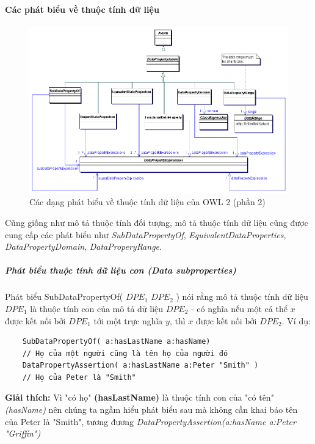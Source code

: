 	\paragraph{Các phát biểu về thuộc tính dữ liệu}
	\begin{figure}[h]
		\centering
		\includegraphics[width=150mm]{Figures/datapropertyAxiom.png}
		\caption{Các dạng phát biểu về thuộc tính dữ liệu của OWL 2 (phần 2) \label{overflow}}
	\end{figure}
	Cũng giống như mô tả thuộc tính đối tượng, mô tả thuộc tính dữ liệu cũng được cung cấp các phát biểu như \textit{SubDataPropertyOf}, \textit{EquivalentDataProperties}, \textit{DataPropertyDomain}, \textit{DataProperyRange}.
	
	\subparagraph{Phát biểu thuộc tính dữ liệu con (Data subproperties)} Phát biểu SubDataPropertyOf( $DPE_{1}$ $DPE_{2}$ ) nói rằng mô tả thuộc tính dữ liệu $DPE_{1}$ là thuộc tính con của mô tả dữ liệu $DPE_{2}$ - có nghĩa nếu một cá thể $x$ được kết nối bởi $DPE_{1}$ tới một trực nghĩa $y$, thì $x$ được kết nối bởi $DPE_{2}$. Ví dụ:
	\begin{verbatim}
	SubDataPropertyOf( a:hasLastName a:hasName) 
	// Họ của một người cũng là tên họ của người đó
	DataPropertyAssertion( a:hasLastName a:Peter "Smith" )
	// Họ của Peter là "Smith"
	\end{verbatim}
	\textbf{Giải thích:} Vì "có họ" \textbf{(hasLastName)} là thuộc tính con của "có tên" \textit{(hasName)} nên chúng ta ngầm hiểu phát biểu sau mà không cần khai báo tên của Peter là "Smith", tương đương \textit{DataPropertyAssertion(a:hasName a:Peter "Griffin")}
	
